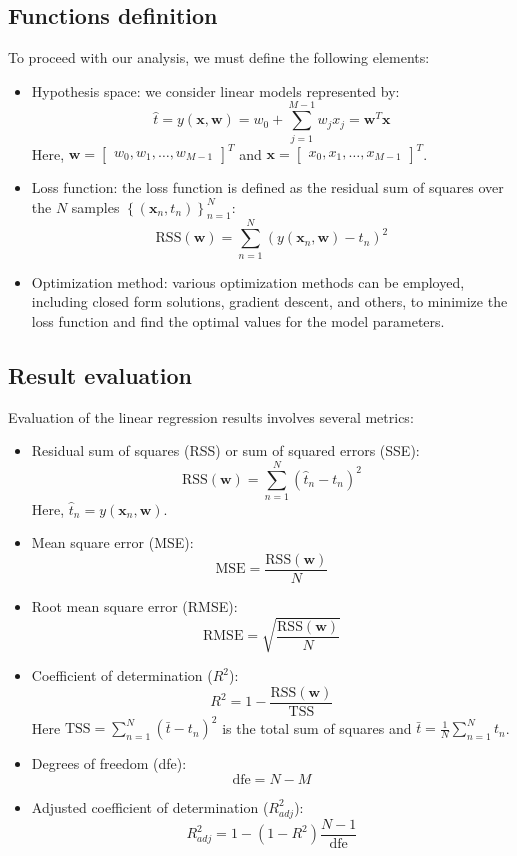 \subsection{Functions definition}
To proceed with our analysis, we must define the following elements:
\begin{itemize}
    \item Hypothesis space: we consider linear models represented by:
        \[\hat{t}=y(\textbf{x},\textbf{w})=w_0+\sum_{j=1}^{M-1}w_j x_j=\textbf{w}^T\textbf{x}\]
        Here, $\textbf{w} = \begin{bmatrix} w_0, w_1, \dots , w_{M-1} \end{bmatrix}^T$ and $\textbf{x} = \begin{bmatrix} x_0, x_1, \dots , x_{M-1} \end{bmatrix}^T$.
    \item Loss function: the loss function is defined as the residual sum of squares over the $N$ samples ${\left\{(\textbf{x}_n, t_n)\right\}}^{N}_{n=1}$: 
        \[\text{RSS}(\textbf{w})=\sum_{n=1}^N{\left( y(\textbf{x}_n,\textbf{w})-t_n \right)}^2\]
    \item Optimization method: various optimization methods can be employed, including closed form solutions, gradient descent, and others, to minimize the loss function and find the optimal values for the model parameters.
\end{itemize}

\subsection{Result evaluation}
Evaluation of the linear regression results involves several metrics:
\begin{itemize}
    \item Residual sum of squares (RSS) or sum of squared errors (SSE):
        \[\text{RSS}(\textbf{w})=\sum_{n=1}^N{\left(\hat{t}_n-t_n\right)}^2\]
        Here, $\hat{t}_n=y(\textbf{x}_n,\textbf{w})$. 
    \item Mean square error (MSE):
        \[\text{MSE}=\dfrac{\text{RSS}(\textbf{w})}{N}\]
    \item Root mean square error (RMSE):
        \[\text{RMSE}=\sqrt{\dfrac{\text{RSS}(\textbf{w})}{N}}\]
    \item Coefficient of determination ($R^2$):
        \[R^2=1-\dfrac{\text{RSS}(\textbf{w})}{\text{TSS}}\]
        Here $\text{TSS}=\sum_{n=1}^{N}{\left(\bar{t}-t_n\right)}^2$ is the total sum of squares and $\bar{t}=\frac{1}{N}\sum_{n=1}^{N}t_n$. 
    \item Degrees of freedom (dfe):
        \[\text{dfe}=N-M\]
    \item Adjusted coefficient of determination ($R^2_{adj}$):
        \[R^2_{adj}=1-\left(1-R^2\right)\dfrac{N-1}{\text{dfe}}\]
\end{itemize}

